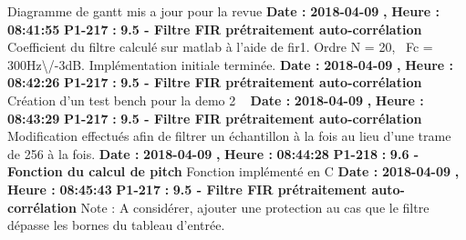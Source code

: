 \documentclass{article}%
\begin{document}
\newline%
%
Diagramme de gantt mis a jour pour la revue\newline%
\newline%
%
\textbf{Date : }%
\textbf{2018{-}04{-}09}%
\textbf{,}%
\textbf{ Heure : }%
\textbf{08:41:55}%
\newline%
%
\textbf{P1{-}217 }%
\textbf{ : }%
\textbf{ 9.5 {-} Filtre FIR prétraitement auto{-}corrélation}%
\newline%
\newline%
%
Coefficient du filtre calculé sur matlab à l'aide de fir1. Ordre N = 20,~ Fc = 300Hz\textbackslash{}/{-}3dB.\newline%
Implémentation initiale terminée.\newline%
\newline%
%
\textbf{Date : }%
\textbf{2018{-}04{-}09}%
\textbf{,}%
\textbf{ Heure : }%
\textbf{08:42:26}%
\newline%
%
\textbf{P1{-}217 }%
\textbf{ : }%
\textbf{ 9.5 {-} Filtre FIR prétraitement auto{-}corrélation}%
\newline%
\newline%
%
Création d'un test bench pour la demo 2\newline%
~\newline%
\newline%
%
\textbf{Date : }%
\textbf{2018{-}04{-}09}%
\textbf{,}%
\textbf{ Heure : }%
\textbf{08:43:29}%
\newline%
%
\textbf{P1{-}217 }%
\textbf{ : }%
\textbf{ 9.5 {-} Filtre FIR prétraitement auto{-}corrélation}%
\newline%
\newline%
%
Modification effectués afin de filtrer un échantillon à la fois au lieu d'une trame de 256 à la fois.\newline%
\newline%
%
\textbf{Date : }%
\textbf{2018{-}04{-}09}%
\textbf{,}%
\textbf{ Heure : }%
\textbf{08:44:28}%
\newline%
%
\textbf{P1{-}218 }%
\textbf{ : }%
\textbf{ 9.6 {-} Fonction du calcul de pitch}%
\newline%
\newline%
%
Fonction implémenté en C\newline%
\newline%
%
\textbf{Date : }%
\textbf{2018{-}04{-}09}%
\textbf{,}%
\textbf{ Heure : }%
\textbf{08:45:43}%
\newline%
%
\textbf{P1{-}217 }%
\textbf{ : }%
\textbf{ 9.5 {-} Filtre FIR prétraitement auto{-}corrélation}%
\newline%
\newline%
%
Note : A considérer, ajouter une protection au cas que le filtre dépasse les bornes du tableau d'entrée.\newline%
\newline%
%
\newpage
\end{document}
